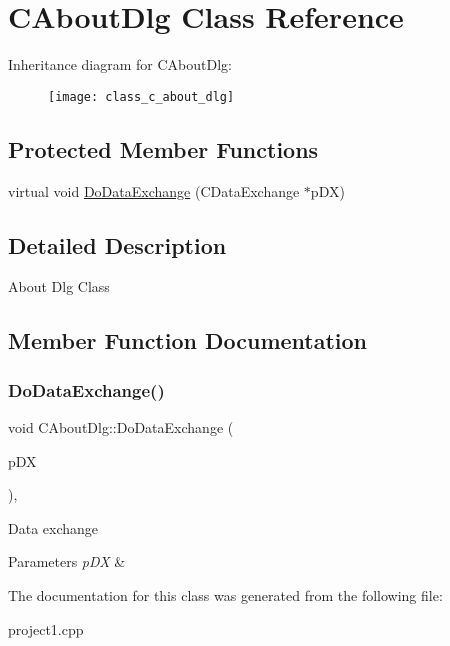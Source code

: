 \hypertarget{class_c_about_dlg}{}\section{C\+About\+Dlg Class Reference}
\label{class_c_about_dlg}
Inheritance diagram for C\+About\+Dlg\+:\begin{figure}[H]
\begin{center}
\leavevmode
\texttt{[image: class\_c\_about\_dlg]}
\end{center}
\end{figure}
\subsection*{Protected Member Functions}
\begin{DoxyCompactItemize}
\item 
virtual void \mbox{\hyperlink{class_c_about_dlg_ab83db7484fec957282d7d5a21aed4df4}{Do\+Data\+Exchange}} (C\+Data\+Exchange $\ast$p\+DX)
\end{DoxyCompactItemize}


\subsection{Detailed Description}
About Dlg Class 

\subsection{Member Function Documentation}
\mbox{\label{class_c_about_dlg_ab83db7484fec957282d7d5a21aed4df4}} 
\subsubsection{\texorpdfstring{DoDataExchange()}{DoDataExchange()}}
{\footnotesize\ttfamily void C\+About\+Dlg\+::\+Do\+Data\+Exchange (\begin{DoxyParamCaption}\item[{C\+Data\+Exchange $\ast$}]{p\+DX }\end{DoxyParamCaption})\hspace{0.3cm}{\ttfamily [protected]}, {\ttfamily [virtual]}}

Data exchange 
\begin{DoxyParams}{Parameters}
{\em p\+DX} & \\
\hline
\end{DoxyParams}


The documentation for this class was generated from the following file\+:\begin{DoxyCompactItemize}
\item 
project1.\+cpp\end{DoxyCompactItemize}
